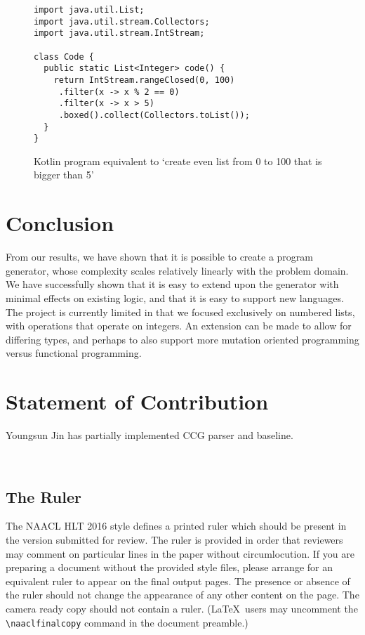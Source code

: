 \documentclass[11pt,letterpaper]{article}
\begin{document}
\begin{figure}[t!]
  \small
  \begin{verbatim}
import java.util.List;
import java.util.stream.Collectors;
import java.util.stream.IntStream;

class Code {
  public static List<Integer> code() {
    return IntStream.rangeClosed(0, 100)
     .filter(x -> x % 2 == 0)
     .filter(x -> x > 5)
     .boxed().collect(Collectors.toList());
  }
}
  \end{verbatim}
  \caption{Kotlin program equivalent to \lq create even list from 0 to 100 that is bigger than 5'}
\end{figure}
\section{Conclusion}

From our results, we have shown that it is possible to create a program generator, whose complexity scales relatively linearly with the problem domain.
We have successfully shown that it is easy to extend upon the generator with minimal effects on existing logic, and that it is easy to support new languages.
The project is currently limited in that we focused exclusively on numbered lists, with operations that operate on integers.
An extension can be made to allow for differing types, and perhaps to also support more mutation oriented programming versus functional programming.

\mbox{}
\nocite{*}



\section{Statement of Contribution}
Youngsun Jin has partially implemented CCG parser and baseline.

%
%

\pagebreak
~
\pagebreak

\subsection{The Ruler}
The NAACL HLT 2016 style defines a printed ruler which should be present in the
version submitted for review.  The ruler is provided in order that
reviewers may comment on particular lines in the paper without
circumlocution.  If you are preparing a document without the provided
style files, please arrange for an equivalent ruler to
appear on the final output pages.  The presence or absence of the ruler
should not change the appearance of any other content on the page.  The
camera ready copy should not contain a ruler. (\LaTeX\ users may uncomment
the {\small\verb|\naaclfinalcopy|} command in the document preamble.)  
\end{document}
